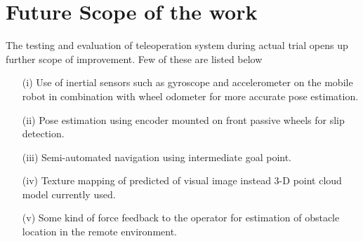 \section{Future Scope of the work}
The testing and evaluation of teleoperation system during actual trial opens up  further scope of improvement. Few of these are listed below  
\begin{itemize}
	\item [(i)] Use of inertial sensors such as gyroscope and accelerometer  on the mobile robot  in combination with wheel odometer for more accurate  pose estimation.   
	
	\item[(ii)]  Pose estimation using encoder mounted on front passive wheels for slip detection.
	
	\item[(iii)] Semi-automated navigation using intermediate goal point.  
	
	\item[(iv)] Texture mapping of predicted of visual image instead 3-D point cloud model currently used.
	\item [(v)] Some kind of force feedback to the operator for estimation of obstacle location in the remote environment.


\end{itemize}	
